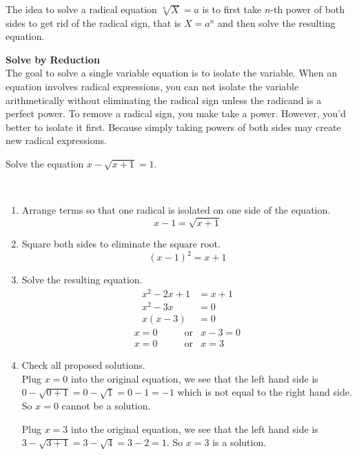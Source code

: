 \documentclass[en,11pt]{elegantbook}
\newcommand{\size}[2]{{\fontsize{#1}{0}\selectfont#2}}
\newenvironment{rmdtip}{
	\vspace*{0.5\baselineskip}
	\par\noindent
	\makebox[-3pt][r]{\color{red!90}\size{12}{\HandRight}\,\,}
    \begin{tcolorbox}[
    enhanced,
    title={\textbf{\color{second}Tips}},
    title style={left color=blue!10!green!20!white,right color=yellow!20!blue!20!white},
    colback=cyan!10!white,
    ]
    \sffamily
}{
    \end{tcolorbox}
    \par\ignorespacesafterend
}
\let\BeginKnitrBlock\begin \let\EndKnitrBlock\end
\begin{document}
The idea to solve a radical equation \(\sqrt[n]{X}=a\) is to first take \(n\)-th power of both sides to get rid of the radical sign, that is \(X=a^n\) and then solve the resulting equation.

\begin{rmdtip}

\textbf{Solve by Reduction}\\
The goal to solve a single variable equation is to isolate the variable. When an equation involves radical expressions, you can not isolate the variable arithmetically without eliminating the radical sign unless the radicand is a perfect power. To remove a radical sign, you make take a power. However, you'd better to isolate it first. Because simply taking powers of both sides may create new radical expressions.

\end{rmdtip}

\BeginKnitrBlock{example}
\protect\hypertarget{exm:unnamed-chunk-155}{}{\label{exm:unnamed-chunk-155} }
Solve the equation \(x-\sqrt{x+1}=1.\)
\EndKnitrBlock{example}

\BeginKnitrBlock{solution}
{}\\

\begin{enumerate}
\def\labelenumi{\arabic{enumi}.}
\item
  Arrange terms so that one radical is isolated on one side of the equation.
  \[x-1=\sqrt{x+1}\]
\item
  Square both sides to eliminate the square root.
  \[(x-1)^2=x+1\]
\item
  Solve the resulting equation.
  \[
     \begin{aligned}
         x^2-2x+1&=x+1\\
         x^2-3x&=0\\
         x(x-3)&=0
     \end{aligned}
  \]
  \[
  \begin{aligned}
     x =0 & \qquad \text{or} & x-3 =0 \\
     x =0 & \qquad \text{or} & x   =3
  \end{aligned}
  \]
\item
  Check all proposed solutions.\\
  Plug \(x=0\) into the original equation, we see that the left hand side is \(0-\sqrt{0+1}=0-\sqrt{1}=0-1=-1\) which is not equal to the right hand side. So \(x=0\) cannot be a solution.

  Plug \(x=3\) into the original equation, we see that the left hand side is \(3-\sqrt{3+1}=3-\sqrt{4}=3-2=1\). So \(x=3\) is a solution.
\end{enumerate}
\EndKnitrBlock{solution}
\end{document}
